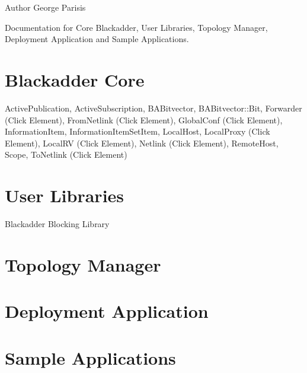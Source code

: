 \begin{DoxyAuthor}{Author}
George Parisis
\end{DoxyAuthor}
Documentation for Core Blackadder, User Libraries, Topology Manager, Deployment Application and Sample Applications.\hypertarget{index_sec1}{}\section{Blackadder Core}\label{index_sec1}
ActivePublication, ActiveSubscription, BABitvector, BABitvector::Bit, Forwarder (Click Element), FromNetlink (Click Element), GlobalConf (Click Element), InformationItem, InformationItemSetItem, LocalHost, LocalProxy (Click Element), LocalRV (Click Element), Netlink (Click Element), RemoteHost, Scope, ToNetlink (Click Element)\hypertarget{index_sec2}{}\section{User Libraries}\label{index_sec2}
Blackadder Blocking Library\hypertarget{index_sec3}{}\section{Topology Manager}\label{index_sec3}
\hypertarget{index_sec4}{}\section{Deployment Application}\label{index_sec4}
\hypertarget{index_sec5}{}\section{Sample Applications}\label{index_sec5}
